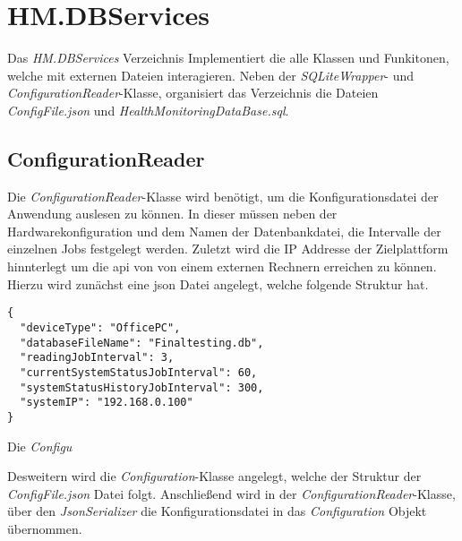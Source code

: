 \newpage
\section{HM.DBServices}\label{sec:HMDBServices}
Das \textit{HM.DBServices} Verzeichnis Implementiert die alle Klassen und Funkitonen, welche mit externen Dateien interagieren. Neben der \textit{SQLiteWrapper}- und \textit{ConfigurationReader}-Klasse, organisiert das Verzeichnis die Dateien \textit{ConfigFile.json} und \textit{HealthMonitoringDataBase.sql}.

\subsection*{ConfigurationReader}
Die \textit{ConfigurationReader}-Klasse wird benötigt, um die Konfigurationsdatei der Anwendung auslesen zu können. In dieser müssen neben der Hardwarekonfiguration und dem Namen der Datenbankdatei, die Intervalle der einzelnen Jobs festgelegt werden. Zuletzt wird die IP Addresse der Zielplattform hinnterlegt um die \ac{api} von von einem externen Rechnern erreichen zu können.\\
Hierzu wird zunächst eine \ac{json} Datei angelegt, welche folgende Struktur hat.
\begin{lstlisting}[caption={Konfigurationsdatei der Hardware-Health-Monitor Anwendung}, label={lst:ConfigFileStrukture}]
{
  "deviceType": "OfficePC",
  "databaseFileName": "Finaltesting.db",
  "readingJobInterval": 3,
  "currentSystemStatusJobInterval": 60,
  "systemStatusHistoryJobInterval": 300,
  "systemIP": "192.168.0.100"
}
\end{lstlisting}
Die \textit{Configu}

Desweitern wird die \textit{Configuration}-Klasse angelegt, welche der Struktur der \textit{ConfigFile.json} Datei folgt. Anschließend wird in der \textit{ConfigurationReader}-Klasse, über den \textit{JsonSerializer} die  Konfigurationsdatei in das \textit{Configuration} Objekt übernommen. 